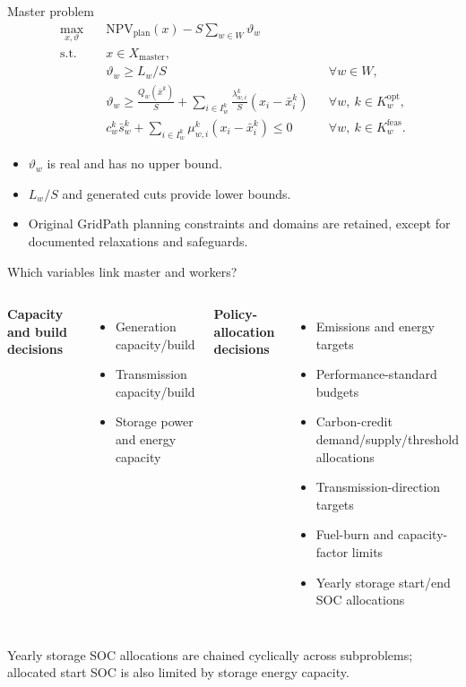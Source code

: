 \documentclass[aspectratio=169,10pt]{beamer}
\begin{document}
\begin{frame}{Master problem}
\small
\[
\begin{aligned}
\max_{x,\vartheta}\quad&
\mathrm{NPV}_{\mathrm{plan}}(x)-S\sum_{w\in W}\vartheta_w\\
\text{s.t.}\quad&x\in X_{\mathrm{master}},\\
&\vartheta_w\geq L_w/S &&\forall w\in W,\\
&\vartheta_w\geq \frac{Q_w(\bar{x}^{k})}{S}
+\sum_{i\in I_w^k}\frac{\lambda_{w,i}^{k}}{S}(x_i-\bar{x}_i^k)
&&\forall w,\ k\in K_w^{\mathrm{opt}},\\
&c_w^k\bar{s}_w^k+\sum_{i\in I_w^k}\mu_{w,i}^k(x_i-\bar{x}_i^k)\leq0
&&\forall w,\ k\in K_w^{\mathrm{feas}}.
\end{aligned}
\]
\begin{itemize}
\item $\vartheta_w$ is real and has no upper bound.
\item $L_w/S$ and generated cuts provide lower bounds.
\item Original GridPath planning constraints and domains are retained, except for documented relaxations and safeguards.
\end{itemize}
\end{frame}

\begin{frame}{Which variables link master and workers?}
\begin{columns}[T]
\textbf{Capacity and build decisions}
\begin{itemize}\item Generation capacity/build\item Transmission capacity/build\item Storage power and energy capacity\end{itemize}
\textbf{Policy-allocation decisions}
\begin{itemize}\item Emissions and energy targets\item Performance-standard budgets\item Carbon-credit demand/supply/threshold allocations\item Transmission-direction targets\item Fuel-burn and capacity-factor limits\item Yearly storage start/end SOC allocations\end{itemize}
\end{columns}
Yearly storage SOC allocations are chained cyclically across subproblems; allocated start SOC is also limited by storage energy capacity.
\end{frame}
\end{document}
